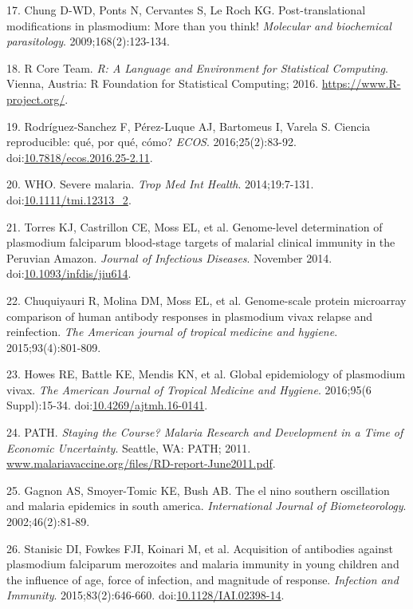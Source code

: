 \documentclass[]{article}
\begin{document}
\hypertarget{ref-leroch2009postmod}{}
17. Chung D-WD, Ponts N, Cervantes S, Le Roch KG. Post-translational
modifications in plasmodium: More than you think! \emph{Molecular and
biochemical parasitology}. 2009;168(2):123-134.

\hypertarget{ref-R}{}
18. R Core Team. \emph{R: A Language and Environment for Statistical
Computing}. Vienna, Austria: R Foundation for Statistical Computing;
2016. \url{https://www.R-project.org/}.

\hypertarget{ref-CienciaReproducible2016}{}
19. Rodríguez-Sanchez F, Pérez-Luque AJ, Bartomeus I, Varela S. Ciencia
reproducible: qué, por qué, cómo? \emph{ECOS}. 2016;25(2):83-92.
doi:\href{https://doi.org/10.7818/ecos.2016.25-2.11}{10.7818/ecos.2016.25-2.11}.

\hypertarget{ref-WHO2014severe}{}
20. WHO. Severe malaria. \emph{Trop Med Int Health}. 2014;19:7-131.
doi:\href{https://doi.org/10.1111/tmi.12313_2}{10.1111/tmi.12313\_2}.

\hypertarget{ref-Torres2014asymptomatic}{}
21. Torres KJ, Castrillon CE, Moss EL, et al. Genome-level determination
of plasmodium falciparum blood-stage targets of malarial clinical
immunity in the Peruvian Amazon. \emph{Journal of Infectious Diseases}.
November 2014.
doi:\href{https://doi.org/10.1093/infdis/jiu614}{10.1093/infdis/jiu614}.

\hypertarget{ref-chuquiyauri2015vivax}{}
22. Chuquiyauri R, Molina DM, Moss EL, et al. Genome-scale protein
microarray comparison of human antibody responses in plasmodium vivax
relapse and reinfection. \emph{The American journal of tropical medicine
and hygiene}. 2015;93(4):801-809.

\hypertarget{ref-howes2016global}{}
23. Howes RE, Battle KE, Mendis KN, et al. Global epidemiology of
plasmodium vivax. \emph{The American Journal of Tropical Medicine and
Hygiene}. 2016;95(6 Suppl):15-34.
doi:\href{https://doi.org/10.4269/ajtmh.16-0141}{10.4269/ajtmh.16-0141}.

\hypertarget{ref-path2011}{}
24. PATH. \emph{Staying the Course? Malaria Research and Development in
a Time of Economic Uncertainty}. Seattle, WA: PATH; 2011.
\url{www.malariavaccine.org/files/RD-report-June2011.pdf}.

\hypertarget{ref-gagnon2002enso}{}
25. Gagnon AS, Smoyer-Tomic KE, Bush AB. The el nino southern
oscillation and malaria epidemics in south america. \emph{International
Journal of Biometeorology}. 2002;46(2):81-89.

\hypertarget{ref-Stanisic2015}{}
26. Stanisic DI, Fowkes FJI, Koinari M, et al. Acquisition of antibodies
against plasmodium falciparum merozoites and malaria immunity in young
children and the influence of age, force of infection, and magnitude of
response. \emph{Infection and Immunity}. 2015;83(2):646-660.
doi:\href{https://doi.org/10.1128/IAI.02398-14}{10.1128/IAI.02398-14}.
\end{document}
